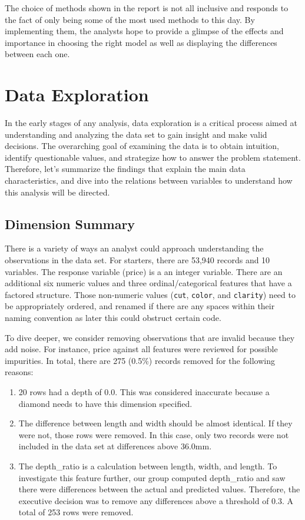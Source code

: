 \documentclass[
  paper=a4,
  ,captions=tableheading
]{scrartcl}
\begin{document}
The choice of methods shown in the report is not all inclusive and
responds to the fact of only being some of the most used methods to this
day. By implementing them, the analysts hope to provide a glimpse of the
effects and importance in choosing the right model as well as displaying
the differences between each one.

\hypertarget{data-exploration}{%
\section{Data Exploration}\label{data-exploration}}

In the early stages of any analysis, data exploration is a critical
process aimed at understanding and analyzing the data set to gain
insight and make valid decisions. The overarching goal of examining the
data is to obtain intuition, identify questionable values, and
strategize how to answer the problem statement. Therefore, let's
summarize the findings that explain the main data characteristics, and
dive into the relations between variables to understand how this
analysis will be directed.

\hypertarget{dimension-summary}{%
\subsection{Dimension Summary}\label{dimension-summary}}

There is a variety of ways an analyst could approach understanding the
observations in the data set. For starters, there are 53,940 records and
10 variables. The response variable (price) is a an integer variable.
There are an additional six numeric values and three ordinal/categorical
features that have a factored structure. Those non-numeric values
(\texttt{cut}, \texttt{color}, and \texttt{clarity}) need to be
appropriately ordered, and renamed if there are any spaces within their
naming convention as later this could obstruct certain code.

To dive deeper, we consider removing observations that are invalid
because they add noise. For instance, price against all features were
reviewed for possible impurities. In total, there are 275 (0.5\%)
records removed for the following reasons:

\begin{enumerate}
\def\labelenumi{\arabic{enumi}.}
\item
  20 rows had a depth of 0.0. This was considered inaccurate because a
  diamond needs to have this dimension specified.
\item
  The difference between length and width should be almost identical. If
  they were not, those rows were removed. In this case, only two records
  were not included in the data set at differences above 36.0mm.
\item
  The depth\_ratio is a calculation between length, width, and length.
  To investigate this feature further, our group computed depth\_ratio
  and saw there were differences between the actual and predicted
  values. Therefore, the executive decision was to remove any
  differences above a threshold of 0.3. A total of 253 rows were
  removed.
\end{enumerate}
\end{document}
